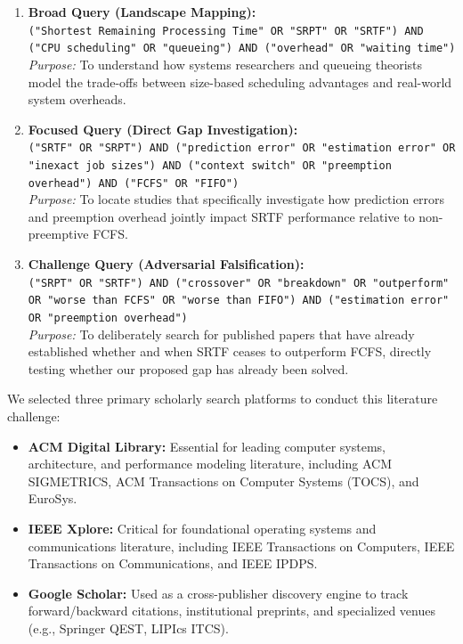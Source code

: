 \documentclass[11pt]{article}
\newcommand{\topicTitle}[1]{
    \vspace{1.2em}\noindent{\fontsize{14}{16.8}\selectfont \textbf{#1}}\par\vspace{0.5em}
}
\begin{document}
\begin{enumerate}[leftmargin=1.5em]
    \item \textbf{Broad Query (Landscape Mapping):} \\
    \texttt{("Shortest Remaining Processing Time" OR "SRPT" OR "SRTF") AND ("CPU scheduling" OR "queueing") AND ("overhead" OR "waiting time")} \\
    \textit{Purpose:} To understand how systems researchers and queueing theorists model the trade-offs between size-based scheduling advantages and real-world system overheads.

    \vspace{0.4em}
    \item \textbf{Focused Query (Direct Gap Investigation):} \\
    \texttt{("SRTF" OR "SRPT") AND ("prediction error" OR "estimation error" OR "inexact job sizes") AND ("context switch" OR "preemption overhead") AND ("FCFS" OR "FIFO")} \\
    \textit{Purpose:} To locate studies that specifically investigate how prediction errors and preemption overhead jointly impact SRTF performance relative to non-preemptive FCFS.

    \vspace{0.4em}
    \item \textbf{Challenge Query (Adversarial Falsification):} \\
    \texttt{("SRPT" OR "SRTF") AND ("crossover" OR "breakdown" OR "outperform" OR "worse than FCFS" OR "worse than FIFO") AND ("estimation error" OR "preemption overhead")} \\
    \textit{Purpose:} To deliberately search for published papers that have already established whether and when SRTF ceases to outperform FCFS, directly testing whether our proposed gap has already been solved.
\end{enumerate}

\vspace{0.8em}
\topicTitle{D. Select Sources}

We selected three primary scholarly search platforms to conduct this literature challenge:
\begin{itemize}[leftmargin=1.5em]
    \item \textbf{ACM Digital Library:} Essential for leading computer systems, architecture, and performance modeling literature, including ACM SIGMETRICS, ACM Transactions on Computer Systems (TOCS), and EuroSys.
    \item \textbf{IEEE Xplore:} Critical for foundational operating systems and communications literature, including IEEE Transactions on Computers, IEEE Transactions on Communications, and IEEE IPDPS.
    \item \textbf{Google Scholar:} Used as a cross-publisher discovery engine to track forward/backward citations, institutional preprints, and specialized venues (e.g., Springer QEST, LIPIcs ITCS).
\end{itemize}
\end{document}
